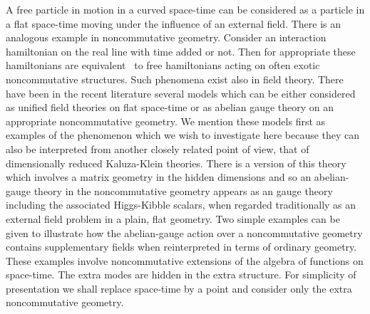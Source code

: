 \documentclass[a4paper,12pt]{article}
\def\b#1{{\mathbb #1}}
\begin{document}
A free particle in motion in a curved space-time can be considered as
a particle in a flat space-time moving under the influence of an
external field. There is an analogous example in noncommutative
geometry.  Consider an interaction hamiltonian \coordHE{} on the
real line \myHighlight{$\b{R}$}\coordHE{} with time added or not. Then for appropriate \coordHE{}
these hamiltonians are equivalent~\cite{SchWes92,Wes99} to free
hamiltonians acting on often exotic noncommutative structures. Such
phenomena exist also in field theory.  There have been in the recent
literature several models which can be either considered as unified
field theories on flat space-time or as abelian gauge theory on an
appropriate noncommutative geometry.  We mention these models first as
examples of the phenomenon which we wish to investigate here because
they can also be interpreted from another closely related point of
view, that of dimensionally reduced Kaluza-Klein theories. There is a
version of this theory which involves a matrix geometry in the hidden
dimensions and so an abelian-gauge theory in the noncommutative
geometry appears as an \coordHE{} gauge theory including the associated
Higgs-Kibble scalars, when regarded traditionally as an external field
problem in a plain, flat geometry. Two simple examples can be given to
illustrate how the abelian-gauge action over a noncommutative geometry
contains supplementary fields when reinterpreted in terms of ordinary
geometry.  These examples involve noncommutative extensions of the
algebra of functions on space-time.  The extra modes are hidden in the
extra structure. For simplicity of presentation we shall replace
space-time by a point and consider only the extra noncommutative
geometry.
\end{document}
